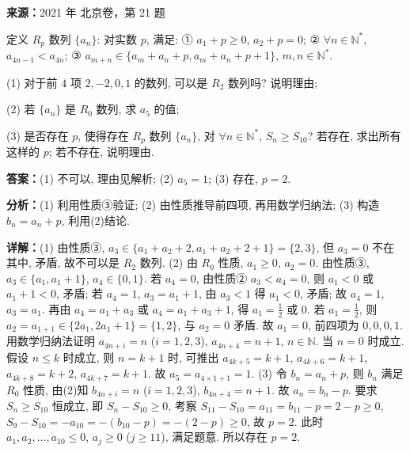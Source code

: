 \begin{question}[points=15]
\textbf{来源：}2021 年 北京卷，第 21 题\par
定义 $R_p$ 数列 $\{a_n\}$: 对实数 $p$, 满足: ① $a_1+p\geq0$, $a_2+p=0$; ② $\forall n\in\mathbb{N}^*$, $a_{4n-1}<a_{4n}$; ③ $a_{m+n}\in\{a_m+a_n+p, a_m+a_n+p+1\}$, $m,n\in\mathbb{N}^*$.

(1) 对于前 $4$ 项 $2,-2,0,1$ 的数列, 可以是 $R_2$ 数列吗? 说明理由;

(2) 若 $\{a_n\}$ 是 $R_0$ 数列, 求 $a_5$ 的值;

(3) 是否存在 $p$, 使得存在 $R_p$ 数列 $\{a_n\}$, 对 $\forall n\in\mathbb{N}^*$, $S_n\geq S_{10}$? 若存在, 求出所有这样的 $p$; 若不存在, 说明理由.
\begin{solution}
\textbf{答案：}(1) 不可以, 理由见解析; (2) $a_5=1$; (3) 存在, $p=2$.

\textbf{分析：}(1) 利用性质③验证; (2) 由性质推导前四项, 再用数学归纳法; (3) 构造 $b_n=a_n+p$, 利用(2)结论.

\textbf{详解：}(1) 由性质③, $a_3\in\{a_1+a_2+2, a_1+a_2+2+1\}=\{2,3\}$, 但 $a_3=0$ 不在其中, 矛盾, 故不可以是 $R_2$ 数列.
(2) 由 $R_0$ 性质, $a_1\geq0$, $a_2=0$. 由性质③, $a_3\in\{a_1, a_1+1\}$, $a_4\in\{0,1\}$. 若 $a_4=0$, 由性质② $a_3<a_4=0$, 则 $a_1<0$ 或 $a_1+1<0$, 矛盾; 若 $a_4=1$, $a_3=a_1+1$, 由 $a_3<1$ 得 $a_1<0$, 矛盾; 故 $a_4=1$, $a_3=a_1$. 再由 $a_4=a_1+a_3$ 或 $a_4=a_1+a_3+1$, 得 $a_1=\frac{1}{2}$ 或 $0$. 若 $a_1=\frac{1}{2}$, 则 $a_2=a_{1+1}\in\{2a_1,2a_1+1\}=\{1,2\}$, 与 $a_2=0$ 矛盾. 故 $a_1=0$, 前四项为 $0,0,0,1$. 用数学归纳法证明 $a_{4n+i}=n$ ($i=1,2,3$), $a_{4n+4}=n+1$, $n\in\mathbb{N}$. 当 $n=0$ 时成立. 假设 $n\leq k$ 时成立, 则 $n=k+1$ 时, 可推出 $a_{4k+5}=k+1$, $a_{4k+6}=k+1$, $a_{4k+8}=k+2$, $a_{4k+7}=k+1$. 故 $a_5=a_{4\times1+1}=1$.
(3) 令 $b_n=a_n+p$, 则 $b_n$ 满足 $R_0$ 性质, 由(2)知 $b_{4n+i}=n$ ($i=1,2,3$), $b_{4n+4}=n+1$. 故 $a_n=b_n-p$. 要求 $S_n\geq S_{10}$ 恒成立, 即 $S_n-S_{10}\geq0$, 考察 $S_{11}-S_{10}=a_{11}=b_{11}-p=2-p\geq0$, $S_9-S_{10}=-a_{10}=-(b_{10}-p)=-(2-p)\geq0$, 故 $p=2$. 此时 $a_1,a_2,\ldots,a_{10}\leq0$, $a_j\geq0$ ($j\geq11$), 满足题意. 所以存在 $p=2$.
\end{solution}
\end{question}

